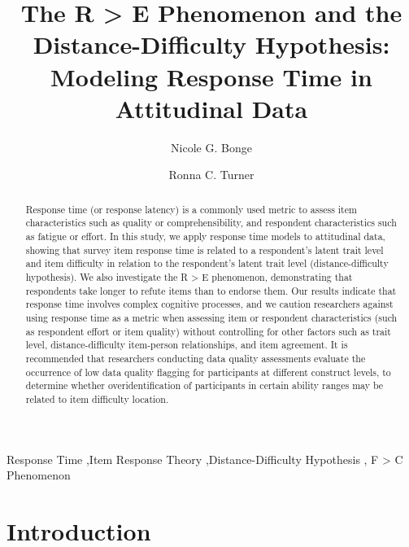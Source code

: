 \documentclass[
  number]{elsarticle}
\begin{document}
\begin{frontmatter}
\title{The R \textgreater{} E Phenomenon and the Distance-Difficulty
Hypothesis: Modeling Response Time in Attitudinal Data}
\author[]{Nicole G. Bonge%
%
}
\author[]{Ronna C. Turner%
%
}




        
\begin{abstract}
Response time (or response latency) is a commonly used metric to assess
item characteristics such as quality or comprehensibility, and
respondent characteristics such as fatigue or effort. In this study, we
apply response time models to attitudinal data, showing that survey item
response time is related to a respondent's latent trait level and item
difficulty in relation to the respondent's latent trait level
(distance-difficulty hypothesis). We also investigate the R
\textgreater{} E phenomenon, demonstrating that respondents take longer
to refute items than to endorse them. Our results indicate that response
time involves complex cognitive processes, and we caution researchers
against using response time as a metric when assessing item or
respondent characteristics (such as respondent effort or item quality)
without controlling for other factors such as trait level,
distance-difficulty item-person relationships, and item agreement. It is
recommended that researchers conducting data quality assessments
evaluate the occurrence of low data quality flagging for participants at
different construct levels, to determine whether overidentification of
participants in certain ability ranges may be related to item difficulty
location.
\end{abstract}





\begin{keyword}
    Response Time \sep Item Response Theory \sep Distance-Difficulty
Hypothesis \sep 
    F \textgreater{} C Phenomenon
\end{keyword}
\end{frontmatter}
    

\section{Introduction}\label{introduction}
\end{document}
